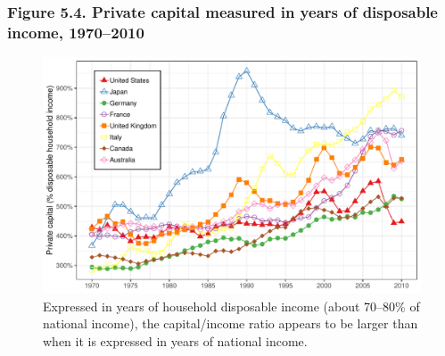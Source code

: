 \documentclass[t]{beamer}\usepackage[]{graphicx}\usepackage[]{color}
\newenvironment{knitrout}{}{} %
\begin{document}
\begin{frame}[label=Figure_5_4]
\frametitle{Figure 5.4. Private capital measured in years of disposable income, 1970--2010}
\begin{figure}[t]
\begin{minipage}[b]{\textwidth}
\centering
\begin{knitrout}\footnotesize
{}\color{fgcolor}

{\centering \includegraphics[width=1\linewidth]{figures/color/Figure_5_4} 

}



\end{knitrout}
\caption{Expressed in years of household disposable income (about 70--80\% of national income), the capital/income ratio appears to be larger than when it is expressed in years of national income.}
\end{minipage}
\end{figure}
\end{frame}
\end{document}
